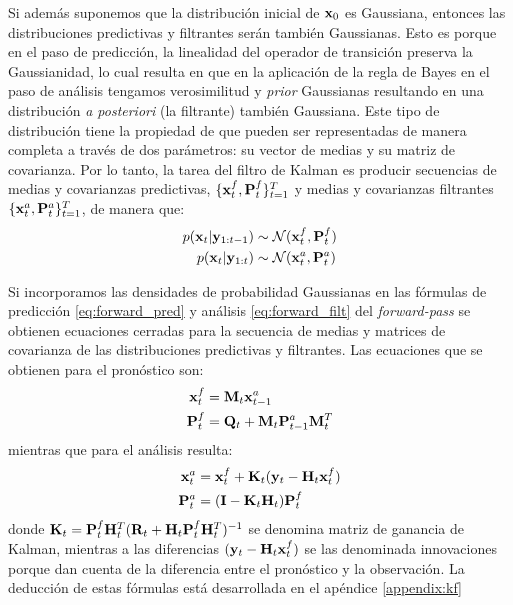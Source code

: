 Si además suponemos que la distribución inicial de $\mathbf{x}_0$ es Gaussiana, entonces las distribuciones predictivas y filtrantes serán también Gaussianas. Esto es porque en el paso de predicción, la linealidad del operador de transición preserva la Gaussianidad, lo cual resulta en que en la aplicación de la regla de Bayes en el paso de análisis tengamos verosimilitud y \textit{prior} Gaussianas resultando en una distribución \textit{a posteriori} (la filtrante) también Gaussiana. Este tipo de distribución tiene la propiedad de que pueden ser representadas de manera completa a través de dos parámetros: su vector de medias y su matriz de covarianza. Por lo tanto, la tarea del filtro de Kalman es producir secuencias de medias y covarianzas predictivas, $\{\mathbf{x}_t^f, \mathbf{P}_t^f\}_{t=1}^{T}$ y medias y covarianzas filtrantes $\{\mathbf{x}_t^a, \mathbf{P}_t^a\}_{t=1}^{T}$, de manera que:
\begin{align*}
    p(\mathbf{x}_t | \mathbf{y}_{1:t-1}) &\sim \mathcal{N}(\mathbf{x}_t^f, \mathbf{P}_t^f) \\
    p(\mathbf{x}_t | \mathbf{y}_{1:t}) &\sim \mathcal{N}(\mathbf{x}_t^a, \mathbf{P}_t^a)
\end{align*}

Si incorporamos las densidades de probabilidad Gaussianas en las fórmulas de predicción \ref{eq:forward_pred} y análisis \ref{eq:forward_filt} del \textit{forward-pass} se obtienen ecuaciones cerradas para la secuencia de medias y matrices de covarianza de las distribuciones predictivas y filtrantes. Las ecuaciones que se obtienen para el pronóstico son:
\begin{align}
    \mathbf{x}_t^f &= \mathbf{M}_t \mathbf{x}_{t-1}^a \label{eq:kf_mean_pred}\\ 
    \mathbf{P}_t^f &= \mathbf{Q}_t + \mathbf{M}_t \mathbf{P}_{t-1}^a \mathbf{M}_t^T \label{eq:kf_var_pred}
\end{align}
mientras que para el análisis resulta:
\begin{align}
    \mathbf{x}_t^a &= \mathbf{x}_t^f + \mathbf{K}_t (\mathbf{y}_t - \mathbf{H}_t \mathbf{x}_t^f) \label{eq:kf_mean_filter} \\ 
    \mathbf{P}_t^a &= (\mathbf{I} - \mathbf{K}_t \mathbf{H}_t) \mathbf{P}_t^f \label{eq:kf_var_filter}
\end{align}
donde $\mathbf{K}_t = \mathbf{P}_t^f \mathbf{H}_t^T(\mathbf{R}_t + \mathbf{H}_t \mathbf{P}_t^f \mathbf{H}_t^T)^{-1}$ se denomina matriz de ganancia de Kalman, mientras a las diferencias $(\mathbf{y}_t - \mathbf{H}_t \mathbf{x}_t^f)$ se las denominada innovaciones porque dan cuenta de la diferencia entre el pronóstico y la observación. La deducción de estas fórmulas está desarrollada en el apéndice \ref{appendix:kf}

